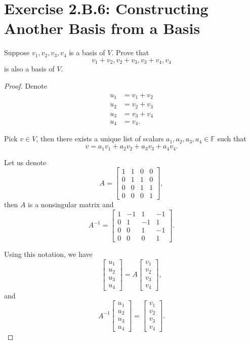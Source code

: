 \section{Exercise 2.B.6: Constructing Another Basis from a Basis}
Suppose $v_1,v_2,v_3,v_4$ is a basis of $V$. Prove that\[
v_1+v_2,v_2+v_3,v_3+v_4,v_4
\] is also a basis of $V$.
\begin{proof}
Denote 
\begin{equation*}
\begin{split}
u_1&=v_1+v_2\\
u_2&=v_2+v_3\\
u_3&=v_3+v_4\\
u_4&=v_4.
\end{split}
\end{equation*}

Pick $v\in V$, then there exists a unique list of scalars $a_1,a_2,a_3,a_4\in\mathbb{F}$ such that\[
v=a_1v_1+a_2v_2+a_3v_3+a_4v_4.
\]

Let us denote \[
A=\begin{bmatrix}
1&1&0&0\\
0&1&1&0\\
0&0&1&1\\
0&0&0&1
\end{bmatrix},
\]then $A$ is a nonsingular matrix and\[
A^{-1}=\begin{bmatrix}
1&-1&1&-1\\
0&1&-1&1\\
0&0&1&-1\\
0&0&0&1
\end{bmatrix}.
\]

Using this notation, we have\[
\begin{bmatrix}
u_1\\
u_2\\
u_3\\
u_4
\end{bmatrix}
=
A\begin{bmatrix}
v_1\\
v_2\\
v_3\\
v_4
\end{bmatrix},
\] and \[
A^{-1}
\begin{bmatrix}
u_1\\
u_2\\
u_3\\
u_4
\end{bmatrix}
=
\begin{bmatrix}
v_1\\
v_2\\
v_3\\
v_4
\end{bmatrix}.
\]


\end{proof}
